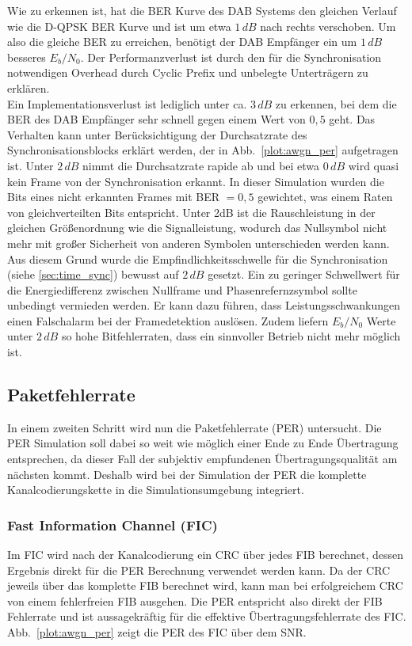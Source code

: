 Wie zu erkennen ist, hat die BER Kurve des DAB Systems den gleichen Verlauf wie die D-QPSK BER Kurve und ist um etwa $1\, dB$ nach rechts verschoben. Um also die gleiche BER zu erreichen, benötigt der DAB Empfänger ein um $1\, dB$ besseres $E_b/N_0$. Der Performanzverlust ist durch den für die Synchronisation notwendigen Overhead durch Cyclic Prefix und unbelegte Unterträgern zu erklären.\\
Ein Implementationsverlust ist lediglich unter ca. $3\, dB$ zu erkennen, bei dem die BER des DAB Empfänger sehr schnell gegen einem Wert von $0,5$ geht. Das Verhalten kann unter Berücksichtigung der Durchsatzrate des Synchronisationsblocks erklärt werden, der in Abb.~\ref{plot:awgn_per} aufgetragen ist. Unter $2\, dB$ nimmt die Durchsatzrate rapide ab und bei etwa $0\, dB$ wird quasi kein Frame von der Synchronisation erkannt. In dieser Simulation wurden die Bits eines nicht erkannten Frames mit BER $= 0,5$ gewichtet, was einem Raten von gleichverteilten Bits entspricht. Unter 2dB ist die Rauschleistung in der gleichen Größenordnung wie die Signalleistung, wodurch das Nullsymbol nicht mehr mit großer Sicherheit von anderen Symbolen unterschieden werden kann. Aus diesem Grund wurde die Empfindlichkeitsschwelle für die Synchronisation (siehe \ref{sec:time_sync}) bewusst auf $2\, dB$ gesetzt. Ein zu geringer Schwellwert für die Energiedifferenz zwischen Nullframe und Phasenrefernzsymbol sollte unbedingt vermieden werden. Er kann dazu führen, dass Leistungsschwankungen einen Falschalarm bei der Framedetektion auslösen. Zudem liefern $E_b/N_0$ Werte unter $2\, dB$ so hohe Bitfehlerraten, dass ein sinnvoller Betrieb nicht mehr möglich ist.

\subsection{Paketfehlerrate}
In einem zweiten Schritt wird nun die Paketfehlerrate (PER) untersucht. Die PER Simulation soll dabei so weit wie möglich einer Ende zu Ende Übertragung entsprechen, da dieser Fall der subjektiv empfundenen Übertragungsqualität am nächsten kommt. Deshalb wird bei der Simulation der PER die komplette Kanalcodierungskette in die Simulationsumgebung integriert.\\
\subsubsection{Fast Information Channel (FIC)}
Im FIC wird nach der Kanalcodierung ein CRC über jedes FIB berechnet, dessen Ergebnis direkt für die PER Berechnung verwendet werden kann. Da der CRC jeweils über das komplette FIB berechnet wird, kann man bei erfolgreichem CRC von einem fehlerfreien FIB ausgehen. Die PER entspricht also direkt der FIB Fehlerrate und ist aussagekräftig für die effektive Übertragungsfehlerrate des FIC. Abb.~\ref{plot:awgn_per} zeigt die PER des FIC über dem SNR.\\

